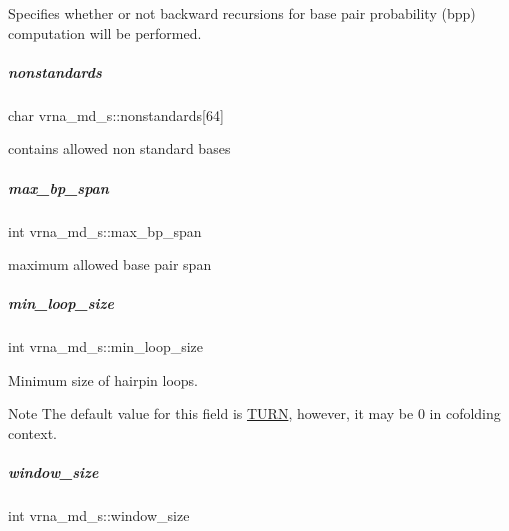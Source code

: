 Specifies whether or not backward recursions for base pair probability (bpp) computation will be performed. 

\mbox{\label{group__model__details_a3fde4ac9eaf972f503c7a76726cefb59}} 
\subparagraph{\texorpdfstring{nonstandards}{nonstandards}}
{\footnotesize\ttfamily char vrna\+\_\+md\+\_\+s\+::nonstandards\mbox{[}64\mbox{]}}



contains allowed non standard bases 

\mbox{\label{group__model__details_a659e5fcc6e8c9f1a68e7de6548eef3b0}} 
\subparagraph{\texorpdfstring{max\+\_\+bp\+\_\+span}{max\_bp\_span}}
{\footnotesize\ttfamily int vrna\+\_\+md\+\_\+s\+::max\+\_\+bp\+\_\+span}



maximum allowed base pair span 

\mbox{\label{group__model__details_a9ed7ba42fcc46915c5c0c524f3d255f5}} 
\subparagraph{\texorpdfstring{min\+\_\+loop\+\_\+size}{min\_loop\_size}}
{\footnotesize\ttfamily int vrna\+\_\+md\+\_\+s\+::min\+\_\+loop\+\_\+size}



Minimum size of hairpin loops. 

\begin{DoxyNote}{Note}
The default value for this field is \mbox{\hyperlink{energy__const_8h_ae646250fd59311356c7e5722a81c3a96}{T\+U\+RN}}, however, it may be 0 in cofolding context. 
\end{DoxyNote}
\mbox{\label{group__model__details_abea42f9229f8d8d6bcbedef316315bfc}} 
\subparagraph{\texorpdfstring{window\+\_\+size}{window\_size}}
{\footnotesize\ttfamily int vrna\+\_\+md\+\_\+s\+::window\+\_\+size}



